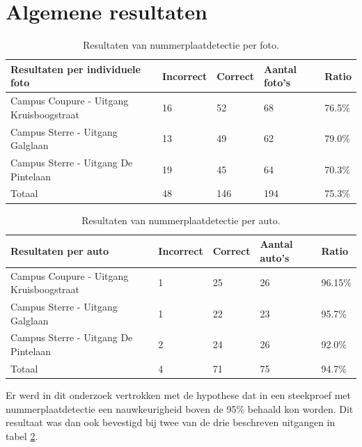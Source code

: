 \section{Algemene resultaten}

\begin{table}[h!]
	\centering
	\begin{tabular}{l|l|l|l|l}
		\textbf{Resultaten per individuele foto}	& \textbf{Incorrect}	& \textbf{Correct} & \textbf{Aantal foto's} & \textbf{Ratio} \\ \hline
		Campus Coupure - Uitgang Kruisboogstraat & 16 & 52 & 68 & 76.5\% \\
		Campus Sterre - Uitgang Galglaan 		 & 13 & 49 & 62 & 79.0\%\\
		Campus Sterre - Uitgang De Pintelaan	 & 19 & 45 & 64 & 70.3\%\\ \hline
		Totaal 									 & 48 & 146 & 194 & 75.3\%
	\end{tabular}
	\caption{Resultaten van nummerplaatdetectie per foto.}
	\label{tab:perpic}
\end{table}

\begin{table}[h!]
	\centering
	\begin{tabular}{l|l|l|l|l}
		\textbf{Resultaten per auto} & \textbf{Incorrect}	& \textbf{Correct} & \textbf{Aantal auto's} & \textbf{Ratio} \\ \hline
		Campus Coupure - Uitgang Kruisboogstraat& 1 & 25  & 26 & 96.15\% \\
		Campus Sterre - Uitgang Galglaan		& 1 & 22  & 23 & 95.7\%\\
		Campus Sterre - Uitgang De Pintelaan	& 2 & 24  & 26 & 92.0\%\\ \hline
		Totaal 									& 4 & 71 & 75 & 94.7\%
	\end{tabular}
	\caption{Resultaten van nummerplaatdetectie per auto.}
	\label{tab:percar}
\end{table}

Er werd in dit onderzoek vertrokken met de hypothese dat in een steekproef met nummerplaatdetectie een nauwkeurigheid boven de 95\% behaald kon worden. Dit resultaat was dan ook bevestigd bij twee van de drie beschreven uitgangen in tabel \ref{tab:percar}.

